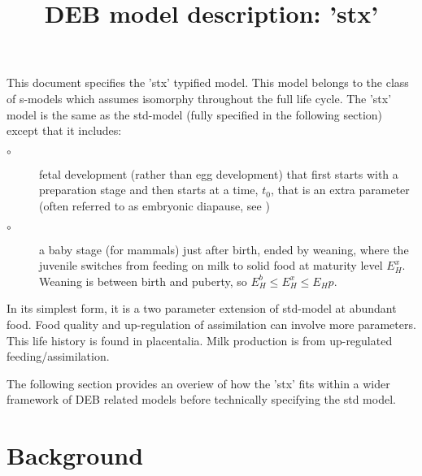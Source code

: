 \documentclass{article}
\title{DEB model description: 'stx'}
\begin{document}
\maketitle

This document specifies the 'stx' typified model.
This model belongs to the class of s-models which assumes isomorphy throughout the full life cycle.
The 'stx' model is the same as the std-model (fully specified in the following section)  except that it includes:
\begin{description}
  \item[$\circ$] fetal development (rather than egg development) that first starts with a preparation stage and then starts at a time, 
	  $t_0$, that is an extra parameter  (often referred to as embryonic diapause, see \citet{DengChen2018})
	
  \item[$\circ$] a baby stage (for mammals) just after birth, ended by weaning, where the juvenile switches from feeding on milk to solid food 
	  at maturity level $E_H^x$.
    Weaning is between birth and puberty, so $E_H^b \le E_H^x \le E_Hp$.  
\end{description}
In its simplest form, it is a two parameter extension of std-model at abundant food.
Food quality and up-regulation of assimilation can involve more parameters.
This life history is found in placentalia.
Milk production is from up-regulated feeding/assimilation.

The following section provides an overiew of how the 'stx' fits within a wider framework of DEB related models before technically specifying the std model.

\section{Background}







\end{document}
